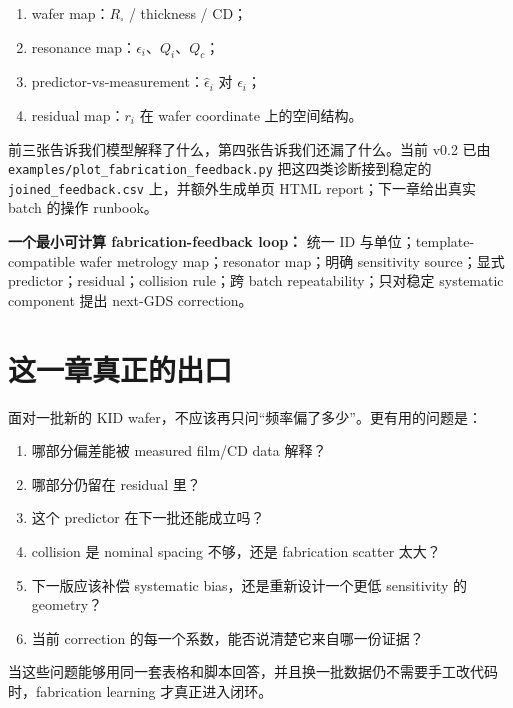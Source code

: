 \begin{enumerate}
  \item wafer map：$R_\square$ / thickness / CD；
  \item resonance map：$\epsilon_i$、$Q_i$、$Q_c$；
  \item predictor-vs-measurement：$\hat{\epsilon}_i$ 对 $\epsilon_i$；
  \item residual map：$r_i$ 在 wafer coordinate 上的空间结构。
\end{enumerate}

前三张告诉我们模型解释了什么，第四张告诉我们还漏了什么。当前 v0.2 已由 \texttt{examples/plot\_fabrication\_feedback.py} 把这四类诊断接到稳定的 \texttt{joined\_feedback.csv} 上，并额外生成单页 HTML report；下一章给出真实 batch 的操作 runbook。

\begin{measurebox}
\textbf{一个最小可计算 fabrication-feedback loop：}
统一 ID 与单位；template-compatible wafer metrology map；resonator map；明确 sensitivity source；显式 predictor；residual；collision rule；跨 batch repeatability；只对稳定 systematic component 提出 next-GDS correction。
\end{measurebox}

\section{这一章真正的出口}

面对一批新的 KID wafer，不应该再只问“频率偏了多少”。更有用的问题是：

\begin{enumerate}
  \item 哪部分偏差能被 measured film/CD data 解释？
  \item 哪部分仍留在 residual 里？
  \item 这个 predictor 在下一批还能成立吗？
  \item collision 是 nominal spacing 不够，还是 fabrication scatter 太大？
  \item 下一版应该补偿 systematic bias，还是重新设计一个更低 sensitivity 的 geometry？
  \item 当前 correction 的每一个系数，能否说清楚它来自哪一份证据？
\end{enumerate}

当这些问题能够用同一套表格和脚本回答，并且换一批数据仍不需要手工改代码时，fabrication learning 才真正进入闭环。
